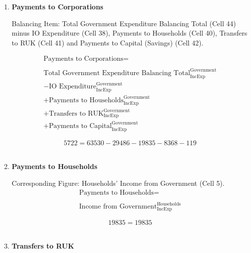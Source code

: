 \begin{enumerate}
\newpage

\item \textbf {Payments to  Corporations}

Balancing Item: Total Government Expenditure Balancing Total (Cell 44) minus IO Expenditure (Cell 38), Payments to Households (Cell 40), Transfers to RUK (Cell 41) and Payments to Capital (Savings) (Cell 42).

\begin{equation}
\begin{split}
\text{Payments to Corporations} =  \\ \\
\text{Total Government Expenditure Balancing Total}^\text{Government}_\text{IncExp}\\
-\text{IO Expenditure}^\text{Government}_\text{IncExp}\\
+\text{Payments to Households}^\text{Government}_\text{IncExp}\\
+\text{Transfers to RUK}^\text{Government}_\text{IncExp}\\
+\text{Payments to Capital}^\text{Government}_\text{IncExp}
\end{split} \label{eq:2.5.43}
\end{equation}

\begin{equation} \nonumber
5722 = 63530-29486-19835-8368-119
\end{equation}\\


\item \textbf {Payments to Households}

Corresponding Figure: Households' Income from Government (Cell 5).\\

\begin{equation}
\begin{split}
\text{Payments to Households} =  \\ \\
\text{Income from Government}^\text{Households}_\text{IncExp}
\end{split} \label{eq:2.5.44}
\end{equation}

\begin{equation} \nonumber
19835 = 19835
\end{equation}\\


\item \textbf {Transfers to RUK}


\end{enumerate}

